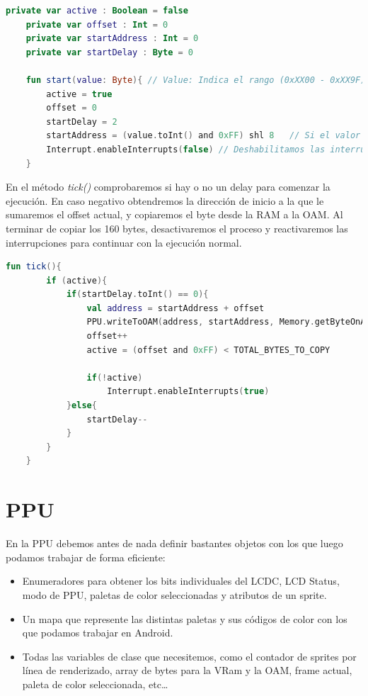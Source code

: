 \begin{lstlisting}[language=Kotlin, caption={Inicio del proceso DMA.}, label={code:dmainit}]
    private var active : Boolean = false
    private var offset : Int = 0
    private var startAddress : Int = 0
    private var startDelay : Byte = 0

    fun start(value: Byte){ // Value: Indica el rango (0xXX00 - 0xXX9F)
        active = true
        offset = 0
        startDelay = 2
        startAddress = (value.toInt() and 0xFF) shl 8   // Si el valor es 0xC0, la dirección será 0xC000
        Interrupt.enableInterrupts(false) // Deshabilitamos las interrupciones
    }
\end{lstlisting}

En el método \textit{tick()} comprobaremos si hay o no un delay para comenzar la ejecución. En caso negativo obtendremos la dirección de inicio a la que le sumaremos el offset actual, y copiaremos el byte desde la RAM a la OAM. Al terminar de copiar los 160 bytes, desactivaremos el proceso y reactivaremos las interrupciones para continuar con la ejecución normal.

\begin{lstlisting}[language=Kotlin, caption={Proceso DMA.}, label={code:dmaprocess}]
    fun tick(){
        if (active){
            if(startDelay.toInt() == 0){
                val address = startAddress + offset
                PPU.writeToOAM(address, startAddress, Memory.getByteOnAddress(address))
                offset++
                active = (offset and 0xFF) < TOTAL_BYTES_TO_COPY

                if(!active)
                    Interrupt.enableInterrupts(true)
            }else{
                startDelay--
            }
        }
    }
\end{lstlisting}

\section{PPU}

En la PPU debemos antes de nada definir bastantes objetos con los que luego podamos trabajar de forma eficiente:
\begin{itemize}
    \item Enumeradores para obtener los bits individuales del LCDC, LCD Status, modo de PPU, paletas de color seleccionadas y atributos de un sprite.
    \item Un mapa que represente las distintas paletas y sus códigos de color con los que podamos trabajar en Android.
    \item Todas las variables de clase que necesitemos, como el contador de sprites por línea de renderizado, array de bytes para la VRam y la OAM, frame actual, paleta de color seleccionada, etc\ldots
\end{itemize}

